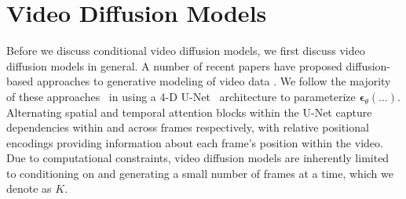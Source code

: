 \section{Video Diffusion Models}
Before we discuss conditional video diffusion models, we first discuss video diffusion models in general. A number of recent papers have proposed diffusion-based approaches to generative modeling of video data \cite{didrik, fdm, vdm, yang2022diffusion, voleti2022MCVD}. 
We follow the majority of these approaches~\cite{fdm,vdm,voleti2022MCVD} in using a 4-D U-Net~\cite{unet} architecture to parameterize $\boldsymbol{\epsilon}_\theta(\ldots)$. 
Alternating spatial and temporal attention blocks within the U-Net capture dependencies within and across frames respectively, with relative positional encodings \cite{rpe1, rpe2} providing information about each frame's position within the video. 
Due to computational constraints, video diffusion models are inherently limited to conditioning on and generating a small number of frames at a time, which we denote as $K$. 

